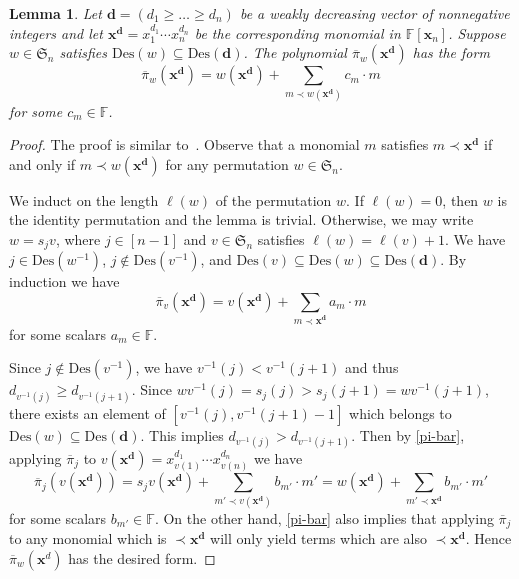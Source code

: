 \documentclass[10pt]{amsart}
\newtheorem{lemma}[theorem]{Lemma}
\theoremstyle{definition}
\newcommand{\Des}{{\mathrm {Des}}}
\newcommand{\symm}{{\mathfrak{S}}}
\newcommand{\FF}{{\mathbb{F}}}
\newcommand{\xx}{{\mathbf {x}}}
\newcommand{\dd}{{\mathbf {d}}}
\newcommand{\pib}{\overline{\pi}}
\begin{document}
\begin{lemma}
\label{demazure-leading-term}
Let $\dd = (d_1 \geq \dots \geq d_n)$ be a weakly decreasing vector of nonnegative integers and let 
$\xx^{\dd} = x_1^{d_1} \cdots x_n^{d_n}$ be the corresponding monomial in $\FF[\xx_n]$.
Suppose $w \in \symm_n$ satisfies $\Des(w) \subseteq \Des(\dd)$.  
The polynomial $\pib_w (\xx^{\dd})$ has the form
\begin{equation}
\pib_w(\xx^{\dd}) = w(\xx^{\dd}) + \sum_{m \prec w(\xx^{\dd})} c_m \cdot m
\end{equation}
for some $c_m \in \FF$.
\end{lemma}

\begin{proof}
The proof is similar to~\cite[Lem. 4.1]{Huang}.
Observe that a monomial $m$ satisfies $m \prec \xx^{\dd}$ if and only if $m \prec w(\xx^{\dd})$ for any permutation 
$w \in \symm_n$.

We induct on the length $\ell(w)$ of the permutation $w$.  If $\ell(w) = 0$, then $w$ is the identity permutation
and the lemma is trivial.  Otherwise, we may write $w = s_j v$, where $j\in[n-1]$ and $v \in \symm_n$ satisfies $\ell(w) = \ell(v) + 1$.
We have $j\in \Des(w^{-1})$, $j\notin \Des(v^{-1})$, and $\Des(v) \subseteq \Des(w)\subseteq \Des(\dd)$.
By induction we have
\begin{equation}
\pib_v(\xx^{\dd}) = v(\xx^{\dd}) + \sum_{m \prec \xx^{\dd}} a_m \cdot m
\end{equation}
for some scalars $a_m \in \FF$.

Since $j\notin \Des(v^{-1})$, we have $v^{-1}(j) < v^{-1}(j+1)$ and thus $d_{v^{-1}(j)} \geq d_{v^{-1}(j+1)}$.
Since $wv^{-1}(j) = s_j(j) > s_j(j+1) = wv^{-1}(j+1)$, there exists an element of $[v^{-1}(j),v^{-1}(j+1)-1]$ which belongs to $\Des(w)\subseteq \Des(\dd)$.
This implies $d_{v^{-1}(j)} > d_{v^{-1}(j+1)}$.
Then by \eqref{pi-bar}, applying $\pib_j$ to $v(\xx^{\dd}) = x_{v(1)}^{d_1}\cdots x_{v(n)}^{d_n}$ we have
\begin{equation}
\pib_j(v(\xx^{\dd})) = s_j v(\xx^{\dd}) + \sum_{m' \prec v(\xx^{\dd})} b_{m'} \cdot m' = w(\xx^{\dd}) +
 \sum_{m' \prec \xx^{\dd}} b_{m'} \cdot m'
\end{equation}
for some scalars $b_{m'} \in \FF$.
On the other hand, \eqref{pi-bar} also implies that applying $\pib_j$ to any monomial which is $\prec \xx^{\dd}$
will only yield terms which are also $\prec \xx^{\dd}$.
Hence $\pib_w(\xx^d)$ has the desired form.
\end{proof}
\end{document}
